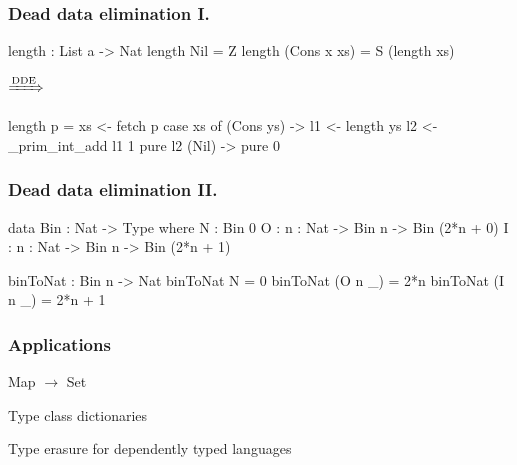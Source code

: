 \documentclass[bigger]{beamer}
\begin{document}
\begin{frame}[fragile]
\frametitle{Dead data elimination I.}

\begin{center}
	\begin{minipage}{0.30\textwidth}
		\begin{haskellcode}
			length : List a -> Nat
			length Nil = Z
			length (Cons x xs)
			  = S (length xs)
		\end{haskellcode}
	\end{minipage}
	\hspace{1cm}
	$\xRightarrow{\text{DDE}}$
	\hfill
	\begin{minipage}{0.5\textwidth}
		\begin{haskellcode}
			length p =
			 xs <- fetch p
			 case xs of
			  (Cons ys) ->
			   l1 <- length ys
			   l2 <- _prim_int_add l1 1
			   pure l2
			  (Nil) ->
			    pure 0
		\end{haskellcode}
	\end{minipage}
\end{center}

\end{frame}


\begin{frame}[fragile]
\frametitle{Dead data elimination II.}

\begin{center}
	\begin{minipage}{0.85\textwidth}
		\begin{haskellcode}
			data Bin : Nat -> Type where
			  N : Bin 0
			  O : {n : Nat} -> Bin n -> Bin (2*n + 0)
			  I : {n : Nat} -> Bin n -> Bin (2*n + 1)
		\end{haskellcode}
		\vspace{0.5cm}
		\pause
		\begin{haskellcode}
			binToNat : Bin n -> Nat
			binToNat N = 0
			binToNat (O {n} _) = 2*n
			binToNat (I {n} _) = 2*n + 1
		\end{haskellcode}
	\end{minipage}
\end{center}

\end{frame}


\begin{frame}
\frametitle{Applications}

	\begin{vfitemize}
		\item Map $\rightarrow$ Set
		\item Type class dictionaries
		\item Type erasure for dependently typed languages
	\end{vfitemize}

\end{frame}
\end{document}
